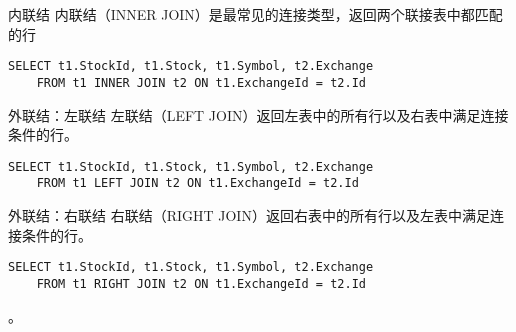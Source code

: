 \documentclass[t]{beamer}
\begin{document}
\begin{frame}[fragile]{内联结}
  内联结（INNER JOIN）是最常见的连接类型，返回两个联接表中都匹配的行
\begin{center}
\end{center}


\begin{lstlisting}
SELECT t1.StockId, t1.Stock, t1.Symbol, t2.Exchange 
    FROM t1 INNER JOIN t2 ON t1.ExchangeId = t2.Id
\end{lstlisting}
\end{frame}


\begin{frame}[fragile]{外联结：左联结}
  左联结（LEFT JOIN）返回左表中的所有行以及右表中满足连接条件的行。
\begin{center}
\end{center}
\begin{lstlisting}
SELECT t1.StockId, t1.Stock, t1.Symbol, t2.Exchange 
    FROM t1 LEFT JOIN t2 ON t1.ExchangeId = t2.Id
\end{lstlisting}
\end{frame}


\begin{frame}[fragile]{外联结：右联结}
  右联结（RIGHT JOIN）返回右表中的所有行以及左表中满足连接条件的行。
\begin{center}
\end{center}
\begin{lstlisting}
SELECT t1.StockId, t1.Stock, t1.Symbol, t2.Exchange 
    FROM t1 RIGHT JOIN t2 ON t1.ExchangeId = t2.Id
\end{lstlisting}
  。
\end{frame}
\end{document}
